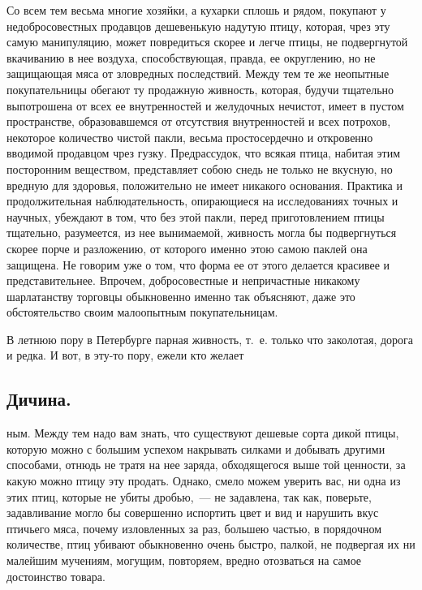 Со всем тем весьма многие хозяйки, а кухарки сплошь и рядом, покупают у недобросовестных продавцов дешевенькую надутую птицу, которая, чрез эту самую манипуляцию, может повредиться скорее и легче птицы, не подвергнутой вкачиванию в нее воздуха, способствующая, правда, ее округлению, но не защищающая мяса от зловредных последствий. Между тем те же неопытные покупательницы обегают ту продажную живность, которая, будучи тщательно выпотрошена от всех ее внутренностей и желудочных нечистот, имеет в пустом пространстве, образовавшемся от отсутствия внутренностей и всех потрохов, некоторое количество чистой пакли, весьма простосердечно и откровенно вводимой продавцом чрез гузку. Предрассудок, что всякая птица, набитая этим посторонним веществом, представляет собою снедь не только не вкусную, но вредную для здоровья, положительно не имеет никакого основания. Практика и продолжительная наблюдательность, опирающиеся на исследованиях точных и научных, убеждают в том, что без этой пакли, перед приготовлением птицы тщательно, разумеется, из нее вынимаемой, живность могла бы подвергнуться скорее порче и разложению, от которого именно этою самою паклей она защищена. Не говорим уже о том, что форма ее от этого делается красивее и представительнее. Впрочем, добросовестные и непричастные никакому шарлатанству торговцы обыкновенно именно так объясняют, даже это обстоятельство своим малоопытным покупательницам.

В летнюю пору в Петербурге парная живность, т.~е. только что заколотая, дорога и редка. И вот, в эту-то пору, ежели кто желает

\subsection{Дичина.}

ным. Между тем надо вам знать, что существуют дешевые сорта дикой птицы, которую можно с большим успехом накрывать силками и добывать другими способами, отнюдь не тратя на нее заряда, обходящегося выше той ценности, за какую можно птицу эту продать. Однако, смело можем уверить вас, ни одна из этих птиц, которые не убиты дробью,~--- не задавлена, так как, поверьте, задавливание могло бы совершенно испортить цвет и вид и нарушить вкус птичьего мяса, почему изловленных за раз, большею частью, в порядочном количестве, птиц убивают обыкновенно очень быстро, палкой, не подвергая их ни малейшим мучениям, могущим, повторяем, вредно отозваться на самое достоинство товара.

